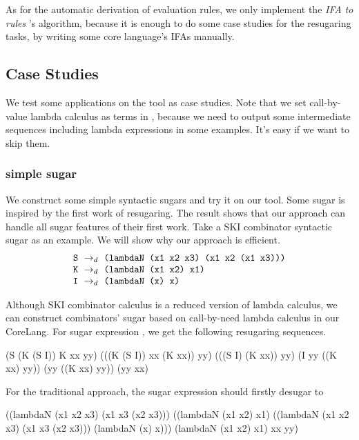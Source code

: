 As for the automatic derivation of evaluation rules, we only implement the \emph{IFA to rules
}'s algorithm, because it is enough to do some case studies for the resugaring tasks, by writing some core language's IFAs manually.
\subsection{Case Studies}

We test some applications on the tool as case studies. Note that we set call-by-value lambda calculus as terms in , because we need to output some intermediate sequences including lambda expressions in some examples. It's easy if we want to skip them.

\subsubsection{simple sugar}
\label{mark:simple}

We construct some simple syntactic sugars and try it on our tool. Some sugar is inspired by the first work of resugaring\cite{resugaring}. The result shows that our approach can handle all sugar features of their first work.
Take a SKI combinator syntactic sugar as an example. We will show why our approach is efficient.
\[
\begin{array}{l}
\mbox{\tt S} ~\rightarrow_d~ \texttt{(lambdaN (x1 x2 x3) (x1 x2 (x1 x3)))}\\
\mbox{\tt K} ~\rightarrow_d~ \texttt{(lambdaN (x1 x2) x1)}\\
\mbox{\tt I} ~\rightarrow_d~ \texttt{(lambdaN (x) x)}
\end{array}
\]




Although SKI combinator calculus is a reduced version of lambda calculus, we can construct combinators' sugar based on call-by-need lambda calculus in our CoreLang. For sugar expression , we get the following resugaring sequences.
\begin{Codes}
    (S (K (S I)) K xx yy)
\OneStep (((K (S I)) xx (K xx)) yy)
\OneStep (((S I) (K xx)) yy)
\OneStep (I yy ((K xx) yy))
\OneStep (yy ((K xx) yy))
\OneStep (yy xx)
\end{Codes}


For the traditional approach, the sugar expression should firstly desugar to
\begin{Codes}
((lambdaN (x1 x2 x3) (x1 x3 (x2 x3)))
  ((lambdaN (x1 x2) x1)
   ((lambdaN  (x1 x2 x3) (x1 x3 (x2 x3)))
    (lambdaN (x) x)))
  (lambdaN (x1 x2) x1)
  xx yy)
\end{Codes}

